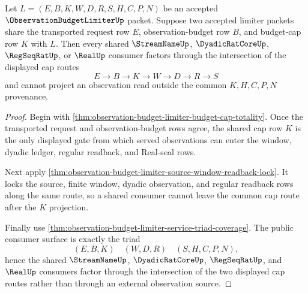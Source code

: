 \begin{theorem}
\label{thm:observation-budget-limiter-cap-intersection}
Let $L=(E,B,K,W,D,R,S,H,C,P,N)$ be an accepted $\ObservationBudgetLimiterUp$ packet. Suppose two accepted limiter packets share the transported request row $E$, observation-budget row $B$, and budget-cap row $K$ with $L$. Then every shared $\StreamNameUp$, $\DyadicRatCoreUp$, $\RegSeqRatUp$, or $\RealUp$ consumer factors through the intersection of the displayed cap routes
$$
E \to B \to K \to W \to D \to R \to S
$$
and cannot project an observation read outside the common $K,H,C,P,N$ provenance.
\end{theorem}
\begin{proof}
Begin with \autoref{thm:observation-budget-limiter-budget-cap-totality}. Once the transported request and observation-budget rows agree, the shared cap row $K$ is the only displayed gate from which served observations can enter the window, dyadic ledger, regular readback, and Real-seal rows.

Next apply \autoref{thm:observation-budget-limiter-source-window-readback-lock}. It locks the source, finite window, dyadic observation, and regular readback rows along the same route, so a shared consumer cannot leave the common cap route after the $K$ projection.

Finally use \autoref{thm:observation-budget-limiter-service-triad-coverage}. The public consumer surface is exactly the triad
$$
(E,B,K) \quad (W,D,R) \quad (S,H,C,P,N),
$$
hence the shared $\StreamNameUp$, $\DyadicRatCoreUp$, $\RegSeqRatUp$, and $\RealUp$ consumers factor through the intersection of the two displayed cap routes rather than through an external observation source.
\end{proof}

